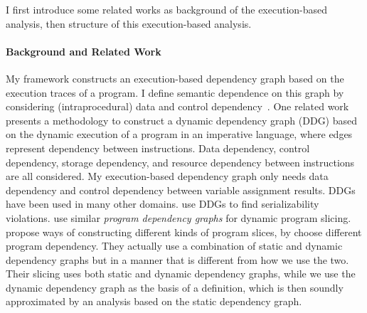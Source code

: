 
I first introduce some related works as background of the execution-based analysis, 
then structure of this execution-based analysis.  
 \paragraph*{Background and Related Work}
 {
My framework constructs an execution-based dependency graph based on the execution traces of a program. I define semantic dependence on this graph by considering (intraprocedural) data and control dependency~\cite{bilardi1996framework,cytron1991efficiently,pollock1989incremental}.    
One related work  
\cite{austin1992dynamic} presents a methodology to construct a dynamic dependency graph (DDG) based on the dynamic execution of a program in an imperative language, where edges represent dependency between instructions. Data dependency, control dependency, storage dependency, and resource dependency between instructions are all considered. My execution-based dependency graph only needs data dependency and control dependency between variable assignment results. 
%
DDGs have been used in many other domains. \cite{nagar2018automated} use DDGs to find serializability violations. \cite{hammer2006dynamic} use similar \emph{program dependency graphs} \cite{ferrante1987program} for dynamic program slicing.
\cite{mastroeni2008data} propose ways of constructing different kinds of program slices, by choose different program dependency. 
They actually use a combination of  
static and dynamic dependency graphs but in a manner that is different from how we use the two. Their slicing uses both static and dynamic dependency graphs, while we use the dynamic dependency graph as the basis of a definition, which is then soundly approximated by an analysis based on the static dependency graph.}

